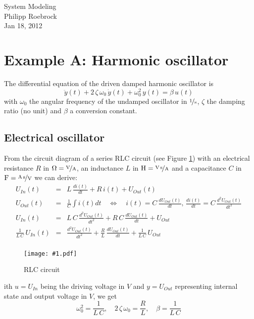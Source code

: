 \documentclass[a4paper,12pt]{article}
\newcommand{\Fig}[4]{%
\begin{figure}[htb]%
\begin{center}%
\texttt{[image: \#1.pdf]}%
\end{center}%
\caption{#3\label{fig:#1}}%
\end{figure}%
}
\newcommand{\FigRef}[1]{Figure \ref{fig:#1}}
\newcommand{\pfrac}[2]{\frac{#1}{#2}}
\newcommand{\Section}[2]{\section{#2}\label{section:#1}}
\newcommand{\SubSection}[2]{\subsection{#2}\label{subsection:#1}}
\begin{document}
\vspace{1.5cm}
\begin{center}
{\Huge System Modeling}\\[3ex]
Philipp Roebrock\\[1ex]
Jan 18, 2012\\
\end{center}
\vspace{1cm}



\Section{examplea}{Example A: Harmonic oscillator}

The differential equation of the driven damped harmonic oscillator is
\begin{equation}
\ddot{y}(t)+2\,\zeta\,\omega_0\,\dot{y}(t)+\omega_0^2\,y(t)=\beta\,u(t)
\end{equation}
with $\omega_0$ the angular frequency of the undamped oscillator in $\unitfrac{1}{s}$, $\zeta$ the damping ratio (no unit) and $\beta$ a conversion constant.\\

\SubSection{exampleaelec}{Electrical oscillator}

From the circuit diagram of a series RLC circuit (see \FigRef{elecoscil}) with an electrical resistance $R$ in $\unit{\Omega}=\unitfrac{V}{A}$, an inductance $L$ in $\unit{H}=\unitfrac{V\,s}{A}$ and a capacitance $C$ in $\unit{F}=\unitfrac{A\,s}{V}$ we can derive:
\begin{eqnarray}
U_{In}(t)&=&L\,\frac{di(t)}{dt}+R\,i(t)+U_{Out}(t)\\
U_{Out}(t)&=&\frac{1}{C}\int i(t)dt\quad\Leftrightarrow\quad i(t)=C\,\frac{dU_{Out}(t)}{dt},\,\frac{di(t)}{dt}=C\,\frac{d^2U_{Out}(t)}{dt^2}\\
U_{In}(t)&=&L\,C\,\frac{d^2U_{Out}(t)}{dt^2}+R\,C\,\frac{dU_{Out}(t)}{dt}+U_{Out}\\
\frac{1}{L\,C}\,U_{In}(t)&=&\frac{d^2U_{Out}(t)}{dt^2}+\frac{R}{L}\,\frac{dU_{Out}(t)}{dt}+\frac{1}{L\,C}\,U_{Out}\\
\end{eqnarray}

\Fig{elecoscil}{0.5}{RLC circuit}

With $u=U_{In}$ being the driving voltage in $\unit{V}$ and $y=U_{Out}$ representing internal state and output voltage in $\unit{V}$, we get
\begin{equation}
\omega_0^2=\pfrac{1}{L\,C},\quad2\,\zeta\,\omega_0=\pfrac{R}{L},\quad\beta=\pfrac{1}{L\,C}
\end{equation}
\end{document}
